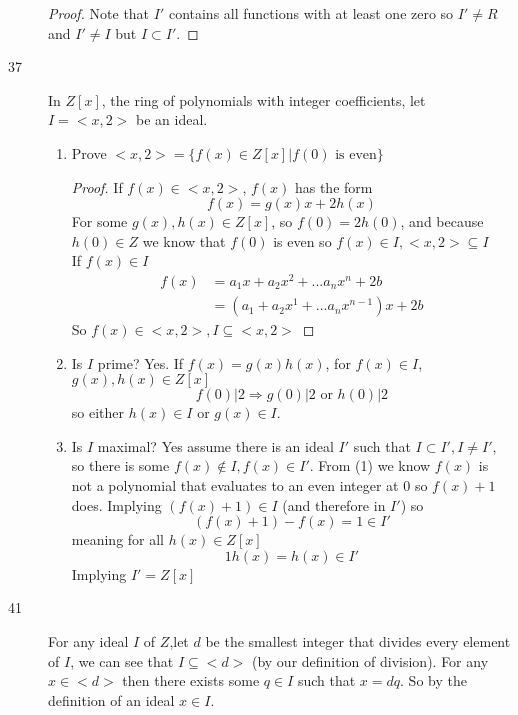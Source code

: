 \documentclass[11pt]{article}
\begin{document}
\begin{description}
\begin{proof}
		Note that $I'$ contains all functions with at least one zero
		 so $I' \neq R$ and $I' \neq I$ but $I \subset I'$.
	\end{proof}
\item[37] In $Z[x]$, the ring of polynomials with integer coefficients, let $I =
	< x, 2 >$ be an ideal.
	\begin{enumerate}
	\item Prove $<x, 2> = \{f(x) \in Z[x] | f(0) \text{ is even}\}$
		\begin{proof}
			If $f(x) \in < x ,2> $, $f(x)$ has the form
		$$ f(x) = g(x)x + 2h(x)$$
		For some $g(x),h(x) \in Z[x]$, so $f(0) = 2h(0)$, and
		because $h(0) \in Z$ we know that $f(0)$ is even so
		$f(x) \in I, <x,2> \subseteq I$\\
		If $f(x) \in I$
		\begin{align*}
			f(x) &= a_1x + a_2x^2 + ... a_nx^n + 2b\\
			&= (a_1 + a_2x^1 + ... a_nx^{n-1})x+ 2b
		\end{align*}
		So $f(x) \in <x,2> , I \subseteq <x,2>$
		\end{proof}
	\item Is $I$ prime? Yes. If $ f(x) = g(x)h(x) $, for $f(x) \in I$, $g(x)
		, h(x) \in Z[x]$
			$$f(0) | 2 \Rightarrow g(0) |2 \text{ or } h(0) | 2$$
		so either $h(x) \in I$ or $g(x) \in I$.
	\item Is $I$ maximal? 
		Yes assume there is an ideal $I'$ such that $I \subset I', I \neq I'$,
			so there is some $f(x) \notin I, f(x) \in I'$. From (1)
			we know
		$f(x)$ is not a polynomial that evaluates to an even integer at
			$0$ so $f(x) + 1$ does. Implying $(f(x) + 1) \in I$ (and
		therefore in $I'$) so
			$$ (f(x) + 1) - f(x) = 1 \in  I' $$
			meaning for all $ h(x) \in Z[x] $
			$$ 1h(x) = h(x) \in I' $$
			Implying $I' = Z[x]$
	\end{enumerate}
\item[41] For any ideal $I$ of $Z$,let $d$ be the smallest integer that divides
	every element of $I$, we can see that $I \subseteq <d>$ (by our
	definition of division). For any $x \in <d>$ 
	then there exists some $q \in I$ such that $x = dq$.
	So by the definition of an ideal $x \in I$.


\end{description}
\end{document}
